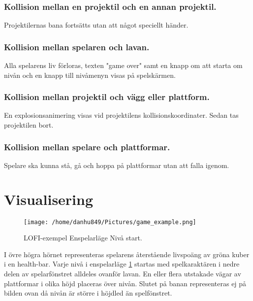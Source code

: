 \documentclass{TDP005mall}
\begin{document}
\subsubsection*{Kollision mellan en projektil och en annan projektil.\label{section:4}}
Projektilernas bana fortsätts utan att något speciellt händer.

\subsubsection*{Kollision mellan spelaren och lavan.\label{section:5}}
Alla spelarens liv förloras, texten "game over" samt en knapp om att starta om nivån och en knapp till nivåmenyn visas på spelskärmen.

\subsubsection*{Kollision mellan projektil och vägg eller plattform.\label{section:6}}
En explosionsanimering visas vid projektilens kollisionskoordinater. Sedan tas projektilen bort.

\subsubsection*{Kollision mellan spelare och plattformar.\label{section:7}}
Spelare ska kunna stå, gå och hoppa på plattformar utan att falla igenom.

\newpage
\section{Visualisering}%

\begin{figure}[h!]
  \caption{LOFI-exempel Enspelarläge Nivå start.\label{fig:7}}
  \centerline{\texttt{[image: /home/danhu849/Pictures/game\_example.png]}}  
\end{figure}

I övre högra hörnet representeras spelarens återstående livspoäng av gröna kuber i en health-bar. Varje nivå i enspelarläge \ref{fig:7} startas med spelkaraktären i nedre delen av spelarfönstret alldeles ovanför lavan. En eller flera utstakade vägar av plattformar i olika höjd placeras över nivån. Slutet på banan representeras ej på bilden ovan då nivån är större i höjdled än spelfönstret.
\end{document}

